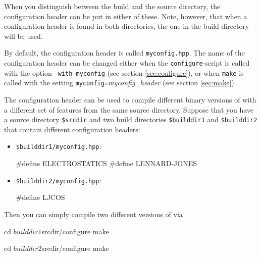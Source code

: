 When you distinguish between the build and the source directory, the
configuration header can be put in either of these. Note, however,
that when a configuration header is found in both directories, the one
in the build directory will be used.

By default, the configuration header is called \texttt{myconfig.hpp}.
The name of the configuration header can be changed either when the
\texttt{configure}-script is called with the option
\mbox{\texttt{--with-myconfig}} (see section \vref{sec:configure}), or
when \texttt{make} is called with the setting
\mbox{\texttt{myconfig=}\textit{myconfig\_header}} (see section
\vref{sec:make}).

The configuration header can be used to compile different binary
versions of \es with a different set of features from the same source
directory.  Suppose that you have a source directory \texttt{\$srcdir}
and two build directories \texttt{\$builddir1} and
\texttt{\$builddir2} that contain different configuration headers:

\begin{itemize}
\item \texttt{\$builddir1/myconfig.hpp}:
\begin{code}
#define ELECTROSTATICS
#define LENNARD-JONES
\end{code}

\item \texttt{\$builddir2/myconfig.hpp}:
\begin{code}
#define LJCOS
\end{code}
\end{itemize}

\noindent Then you can simply compile two different versions of \es via
\begin{code}
cd $builddir1
$srcdir/configure
make

cd $builddir2
$srcdir/configure
make
\end{code}


